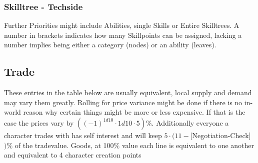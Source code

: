    \subsubsection{Skilltree - Techside}
    Further Priorities might include Abilities, single Skills or Entire Skilltrees.
    A number in brackets indicates how many
    Skillpoints can be assigned, lacking a number implies being either a category (nodes) or an ability (leaves).
    \pagebreak
    \subsection{Trade}\label{subsec:trade}
    These entries in the table below are usually equivalent, local supply and demand may vary them greatly.
    Rolling for price variance might be done if there is no in-world reason why certain things might be more or
    less expensive.
    If that is the case the prices vary by \(((-1)^{1d10}\cdot1d10\cdot5) \%\).
    Additionally everyone a character trades with has self interest and will keep \(5\cdot(11-\)[Negotiation-Check]\()\%\) of
    the tradevalue.\vspace{1.5cm}
    Goods, at 100\% value each line is equivalent to one another and equivalent to 4 character creation points \par
